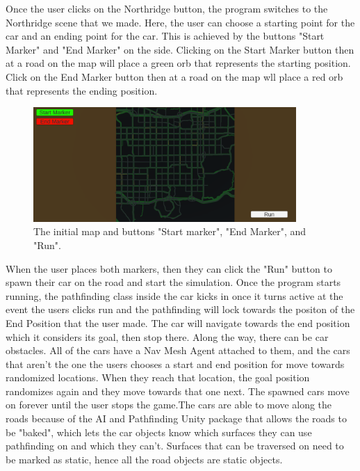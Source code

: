 \begin{flushleft}
Once the user clicks on the Northridge button, the program switches to the Northridge scene that we made. Here, the user can choose a starting point for the car and an ending point for the car. This is achieved by the buttons "Start Marker" and "End Marker" on the side. Clicking on the Start Marker button then at a road on the map will place a green orb that represents the starting position. Click on the End Marker button then at a road on the map wll place a red orb that represents the ending position. 
\end{flushleft}

\begin{figure}[htb]
    \centering
    \includegraphics[width=10cm]{Images/Northridge1.png}
       \caption{The initial map and buttons "Start marker", "End Marker", and "Run".}
           \label{Fig:Game}
\end{figure}

\begin{flushleft}
When the user places both markers, then they can click the "Run" button to spawn their car on the road and start the simulation. Once the program starts running, the pathfinding class inside the car kicks in once it turns active at the event the users clicks run and the pathfinding will lock towards the positon of the End Position that the user made. The car will navigate towards the end position which it considers its goal, then stop there. Along the way, there can be car obstacles. All of the cars have a Nav Mesh Agent attached to them, and the cars that aren't the one the users chooses a start and end position for move towards randomized locations. When they reach that location, the goal position randomizes again and they move towards that one next. The spawned cars move on forever until the user stops the game.The cars are able to move along the roads because of the AI and Pathfinding Unity package that allows the roads to be "baked", which lets the car objects know which surfaces they can use pathfinding on and which they can't. Surfaces that can be traversed on need to be marked as static, hence all the road objects are static objects.
 \end{flushleft}

